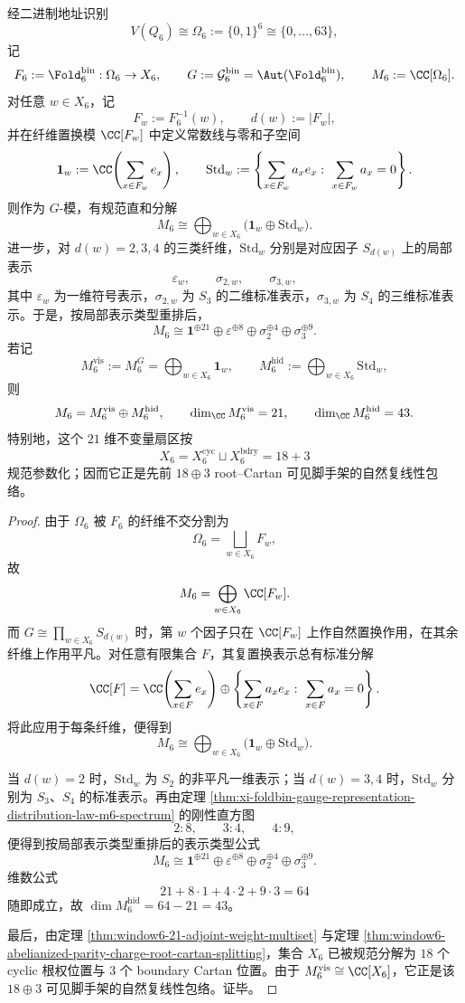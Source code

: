 \begin{theorem}\label{thm:conclusion-window6-permutation-module-visible-hidden-splitting}
经二进制地址识别
\[
V(Q_6)\cong \Omega_6:=\{0,1\}^6\cong \{0,\dots,63\},
\]
记
\[
F_6:=\Fold_6^{\mathrm{bin}}:\Omega_6\to X_6,
\qquad
G:=\mathcal G_6^{\mathrm{bin}}=\Aut(\Fold_6^{\mathrm{bin}}),
\qquad
M_6:=\CC[\Omega_6].
\]
对任意 \(w\in X_6\)，记
\[
F_w:=F_6^{-1}(w),
\qquad
d(w):=|F_w|,
\]
并在纤维置换模 \(\CC[F_w]\) 中定义常数线与零和子空间
\[
\mathbf 1_w:=\CC\!\left(\sum_{x\in F_w}e_x\right),
\qquad
\mathrm{Std}_w:=\left\{\sum_{x\in F_w}a_x e_x:\ \sum_{x\in F_w}a_x=0\right\}.
\]
则作为 \(G\)-模，有规范直和分解
\[
M_6
\cong
\bigoplus_{w\in X_6}\bigl(\mathbf 1_w\oplus \mathrm{Std}_w\bigr).
\]
进一步，对 \(d(w)=2,3,4\) 的三类纤维，\(\mathrm{Std}_w\) 分别是对应因子 \(S_{d(w)}\) 上的局部表示
\[
\varepsilon_w,\qquad \sigma_{2,w},\qquad \sigma_{3,w},
\]
其中 \(\varepsilon_w\) 为一维符号表示，\(\sigma_{2,w}\) 为 \(S_3\) 的二维标准表示，\(\sigma_{3,w}\) 为 \(S_4\) 的三维标准表示。于是，按局部表示类型重排后，
\[
M_6
\cong
\mathbf 1^{\oplus 21}\oplus \varepsilon^{\oplus 8}\oplus \sigma_2^{\oplus 4}\oplus \sigma_3^{\oplus 9}.
\]
若记
\[
M_6^{\mathrm{vis}}:=M_6^G=\bigoplus_{w\in X_6}\mathbf 1_w,
\qquad
M_6^{\mathrm{hid}}:=\bigoplus_{w\in X_6}\mathrm{Std}_w,
\]
则
\[
M_6=M_6^{\mathrm{vis}}\oplus M_6^{\mathrm{hid}},
\qquad
\dim_{\CC}M_6^{\mathrm{vis}}=21,
\qquad
\dim_{\CC}M_6^{\mathrm{hid}}=43.
\]
特别地，这个 \(21\) 维不变量扇区按
\[
X_6=X_6^{\mathrm{cyc}}\sqcup X_6^{\mathrm{bdry}}=18+3
\]
规范参数化；因而它正是先前 \(18\oplus 3\) root--Cartan 可见脚手架的自然复线性包络。
\end{theorem}
\begin{proof}
由于 \(\Omega_6\) 被 \(F_6\) 的纤维不交分割为
\[
\Omega_6=\bigsqcup_{w\in X_6}F_w,
\]
故
\[
M_6=\bigoplus_{w\in X_6}\CC[F_w].
\]
而 \(G\cong \prod_{w\in X_6}S_{d(w)}\) 时，第 \(w\) 个因子只在 \(\CC[F_w]\) 上作自然置换作用，在其余纤维上作用平凡。对任意有限集合 \(F\)，其复置换表示总有标准分解
\[
\CC[F]=\CC\!\left(\sum_{x\in F}e_x\right)\oplus \left\{\sum_{x\in F}a_xe_x:\ \sum_{x\in F}a_x=0\right\}.
\]
将此应用于每条纤维，便得到
\[
M_6
\cong
\bigoplus_{w\in X_6}\bigl(\mathbf 1_w\oplus \mathrm{Std}_w\bigr).
\]

当 \(d(w)=2\) 时，\(\mathrm{Std}_w\) 为 \(S_2\) 的非平凡一维表示；当 \(d(w)=3,4\) 时，\(\mathrm{Std}_w\) 分别为 \(S_3\)、\(S_4\) 的标准表示。再由定理 \ref{thm:xi-foldbin-gauge-representation-distribution-law-m6-spectrum} 的刚性直方图
\[
2:8,\qquad 3:4,\qquad 4:9,
\]
便得到按局部表示类型重排后的表示类型公式
\[
M_6
\cong
\mathbf 1^{\oplus 21}\oplus \varepsilon^{\oplus 8}\oplus \sigma_2^{\oplus 4}\oplus \sigma_3^{\oplus 9}.
\]
维数公式
\[
21+8\cdot 1+4\cdot 2+9\cdot 3=64
\]
随即成立，故 \(\dim M_6^{\mathrm{hid}}=64-21=43\)。

最后，由定理 \ref{thm:window6-21-adjoint-weight-multiset} 与定理 \ref{thm:window6-abelianized-parity-charge-root-cartan-splitting}，集合 \(X_6\) 已被规范分解为 \(18\) 个 cyclic 根权位置与 \(3\) 个 boundary Cartan 位置。由于 \(M_6^{\mathrm{vis}}\cong \CC[X_6]\)，它正是该 \(18\oplus 3\) 可见脚手架的自然复线性包络。证毕。
\end{proof}

